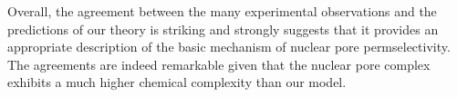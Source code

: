 \documentclass[12pt, a4paper]{article}
\begin{document}

Overall, the agreement between the many experimental observations and the predictions of our theory is striking and strongly suggests that it provides an appropriate description of the basic mechanism of nuclear pore permselectivity.
The agreements are indeed remarkable given that the nuclear pore complex exhibits a much higher chemical complexity than our model.








\printbibliography
\end{document}
